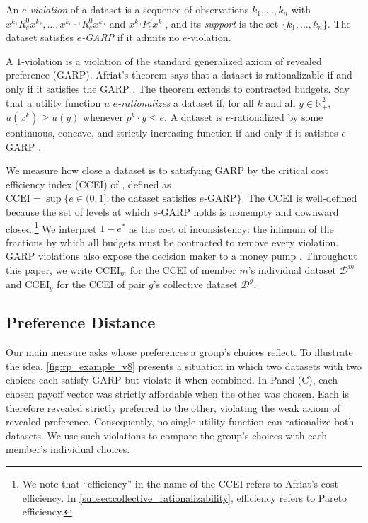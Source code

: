 \documentclass[11 pt]{article}
\begin{document}
\begin{definition}\label{def:eviol}\normalfont
An \emph{$e$-violation} of a dataset is a sequence of observations $k_1, \dots, k_n$ with $x^{k_1} \mathrel{R^{0}_{e}} x^{k_2}, \dots, x^{k_{n-1}} \mathrel{R^{0}_{e}} x^{k_n}$ and $x^{k_n} \mathrel{P^{0}_{e}} x^{k_1}$, and its \emph{support} is the set $\{k_1, \dots, k_n\}$. The dataset satisfies \emph{$e$-GARP} if it admits no $e$-violation.
\end{definition}

A $1$-violation is a violation of the standard generalized axiom of revealed preference (GARP). Afriat's theorem says that a dataset is rationalizable if and only if it satisfies the GARP \citep{Afriat:1967:IER, varian1982nonparametric}. The theorem extends to contracted budgets. Say that a utility function $u$ \emph{$e$-rationalizes} a dataset if, for all $k$ and all $y \in \mathbb{R}^2_{+}$, $u(x^{k}) \geq u(y)$ whenever $p^{k} \cdot y \leq e$. A dataset is $e$-rationalized by some continuous, concave, and strictly increasing function if and only if it satisfies $e$-GARP \citep{afriat1972efficiency, halevyetal:2018:JPE}.

We measure how close a dataset is to satisfying GARP by the critical cost efficiency index (CCEI) of \citet{afriat1972efficiency}, defined as $\text{CCEI} = \sup\bigl\{ e \in (0,1] : \text{the dataset satisfies } e\text{-GARP} \bigr\}$. The CCEI is well-defined because the set of levels at which $e$-GARP holds is nonempty and downward closed.\footnote{We note that ``efficiency'' in the name of the CCEI refers to Afriat's cost efficiency. In \autoref{subsec:collective_rationalizability}, efficiency refers to Pareto efficiency.} We interpret $1-e^*$ as the cost of inconsistency: the infimum of the fractions by which all budgets must be contracted to remove every violation. GARP violations also expose the decision maker to a money pump \citep{echenique2011money}. Throughout this paper, we write $\mathrm{CCEI}_m$ for the CCEI of member $m$'s individual dataset $\mathcal D^m$ and $\mathrm{CCEI}_g$ for the CCEI of pair $g$'s collective dataset $\mathcal D^g$.


\subsection{Preference Distance}\label{subsec:rpd}

Our main measure asks whose preferences a group's choices reflect. To illustrate the idea, \autoref{fig:rp_example_v8} presents a situation in which two datasets with two choices each satisfy GARP but violate it when combined. In Panel (C), each chosen payoff vector was strictly affordable when the other was chosen. Each is therefore revealed strictly preferred to the other, violating the weak axiom of revealed preference. Consequently, no single utility function can rationalize both datasets. We use such violations to compare the group's choices with each member's individual choices.
\end{document}
